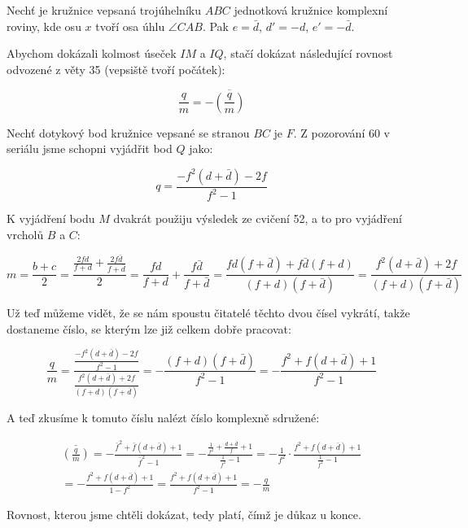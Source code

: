 \documentclass{fkssolpub}
\author{Ondřej Sedláček}
\begin{document}
 

Nechť je kružnice vepsaná trojúhelníku $ABC$ jednotková kružnice
komplexní roviny, kde osu $x$ tvoří osa úhlu $\angle CAB$. Pak
$e = \bar{d}$, $d' = -d$, $e' = -\bar{d}$.

Abychom dokázali kolmost úseček $IM$ a $IQ$, stačí dokázat následující
rovnost odvozené z věty 35 (vepsiště tvoří počátek):

\[
  \frac{q}{m} = -\overline{\left(\frac{q}{m}\right)}
\]

Nechť dotykový bod kružnice vepsané se stranou $BC$ je $F$. Z pozorování
60 v seriálu jsme schopni vyjádřit bod $Q$ jako:

\[
  q = \frac{- f^2 (d + \bar{d}) - 2f}{f^2 - 1}
\]

K vyjádření bodu $M$ dvakrát použiju výsledek ze cvičení 52, a to
pro vyjádření vrcholů $B$ a $C$:

\[
  m = \frac{b + c}{2} = \frac{\frac{2fd}{f+d} + \frac{2f\bar{d}}{f+\bar{d}}}{2}
    = \frac{fd}{f+d} + \frac{f\bar{d}}{f+\bar{d}} 
    = \frac{fd(f+\bar{d}) + f\bar{d}(f+d)}{(f+d)(f+\bar{d})}
    = \frac{f^2 (d + \bar{d}) + 2f}{(f+d)(f+\bar{d})}
\]

Už teď můžeme vidět, že se nám spoustu čitatelé těchto dvou čísel vykrátí,
takže dostaneme číslo, se kterým lze již celkem dobře pracovat:

\[
  \frac{q}{m} 
    = \frac{\frac{- f^2 (d + \bar{d}) - 2f}{f^2 - 1}}{\frac{f^2 (d + \bar{d}) + 2f}{(f+d)(f+\bar{d})}}
    = - \frac{(f+d)(f+\bar{d})}{f^2 - 1} 
    = - \frac{f^2 + f(d + \bar{d}) + 1}{f^2 - 1}
\]

A teď zkusíme k tomuto číslu nalézt číslo komplexně sdružené:

\begin{gather*}
  \overline{\left(\frac{q}{m}\right)} 
    = - \frac{\bar{f}^2 + \bar{f}(d + \bar{d}) + 1}{\bar{f}^2 - 1}
    = - \frac{\frac{1}{f^2} + \frac{d + \bar{d}}{f} + 1}{\frac{1}{f^2} - 1}
    = - \frac{1}{f^2} \cdot \frac{f^2 + f(d + \bar{d}) + 1}{\frac{1}{f^2} - 1} \\
    = - \frac{f^2 + f(d + \bar{d}) + 1}{1 - f^2}
    = \frac{f^2 + f(d + \bar{d}) + 1}{f^2 - 1} = - \frac{q}{m}
\end{gather*}

Rovnost, kterou jsme chtěli dokázat, tedy platí, čímž je důkaz u konce.
\end{document}
